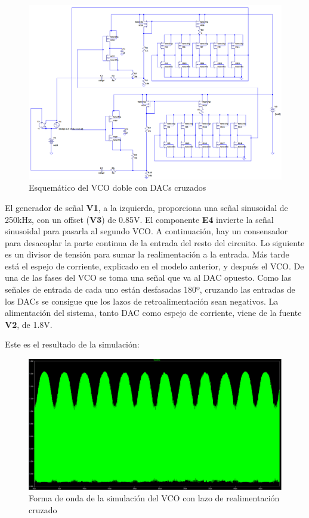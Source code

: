 \documentclass[12pt]{report} %
\begin{document}
	\begin{figure}[H]
		\includegraphics[width=\textwidth]{ltspice-vco-closed-sch.png}
		\caption[Esquemático del VCO doble con DACs cruzados]{Esquemático del VCO doble con DACs cruzados}
		\label{fig:ltspice-vco-closed-sch.png}
	\end{figure}

	El generador de señal \textbf{V1}, a la izquierda, proporciona una señal sinusoidal de 250kHz, con un offset (\textbf{V3}) de 0.85V. El componente \textbf{E4} invierte la señal sinusoidal para pasarla al segundo VCO. A continuación, hay un consensador para desacoplar la parte continua de la entrada del resto del circuito. Lo siguiente es un divisor de tensión para sumar la realimentación a la entrada. Más tarde está el espejo de corriente, explicado en el modelo anterior, y después el VCO. De una de las fases del VCO se toma una señal que va al DAC opuesto. Como las señales de entrada de cada uno están desfasadas 180º, cruzando las entradas de los DACs se consigue que los lazos de retroalimentación sean negativos. La alimentación del sistema, tanto DAC como espejo de corriente, viene de la fuente \textbf{V2}, de 1.8V.
	
	Este es el resultado de la simulación:
	
	\begin{figure}[H]
		\includegraphics[width=\textwidth]{ltspice-vco-closed-wf.png}
		\caption[Forma de onda de la simulación del VCO con lazo de realimentación cruzado]{Forma de onda de la simulación del VCO con lazo de realimentación cruzado}
		\label{fig:ltspice-vco-closed-wf.png}
	\end{figure}
	
\end{document}
